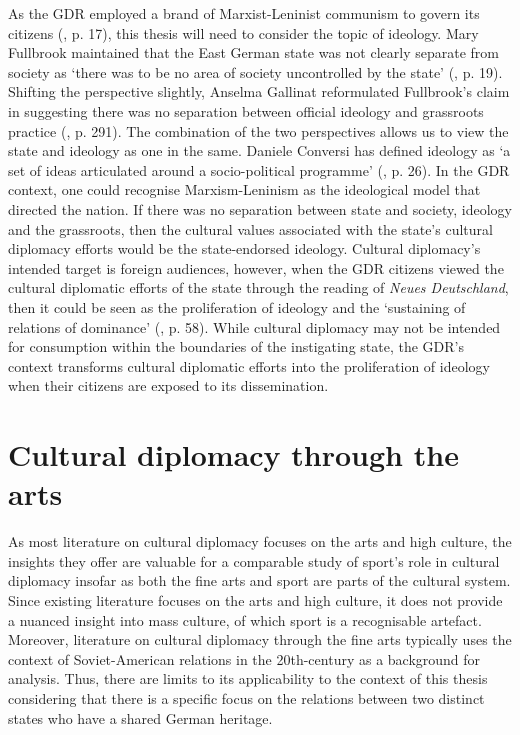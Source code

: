 As the GDR employed a brand of Marxist-Leninist communism to govern its citizens (\cite{grixcooke2002}, p. 17), this thesis will need to consider the topic of ideology. Mary Fullbrook maintained that the East German state was not clearly separate from society as ‘there was to be no area of society uncontrolled by the state’ (\citeyear{fullbrook1995}, p. 19). Shifting the perspective slightly, Anselma Gallinat reformulated Fullbrook’s claim in suggesting there was no separation between official ideology and grassroots practice (\citeyear{gallinat2005}, p. 291). The combination of the two perspectives allows us to view the state and ideology as one in the same. Daniele Conversi has defined ideology as ‘a set of ideas articulated around a socio-political programme’ (\citeyear{conversi2010}, p. 26). In the GDR context, one could recognise Marxism-Leninism as the ideological model that directed the nation. If there was no separation between state and society, ideology and the grassroots, then the cultural values associated with the state’s cultural diplomacy efforts would be the state-endorsed ideology. Cultural diplomacy’s intended target is foreign audiences, however, when the GDR citizens viewed the cultural diplomatic efforts of the state through the reading of \textit{Neues Deutschland}, then it could be seen as the proliferation of ideology and the ‘sustaining of relations of dominance’ (\cite{thompson1990}, p. 58). While cultural diplomacy may not be intended for consumption within the boundaries of the instigating state, the GDR’s context transforms cultural diplomatic efforts into the proliferation of ideology when their citizens are exposed to its dissemination.

\section{Cultural diplomacy through the arts}

As most literature on cultural diplomacy focuses on the arts and high culture, the insights they offer are valuable for a comparable study of sport’s role in cultural diplomacy insofar as both the fine arts and sport are parts of the cultural system. Since existing literature focuses on the arts and high culture, it does not provide a nuanced insight into mass culture, of which sport is a recognisable artefact. Moreover, literature on cultural diplomacy through the fine arts typically uses the context of Soviet-American relations in the 20th-century as a background for analysis. Thus, there are limits to its applicability to the context of this thesis considering that there is a specific focus on the relations between two distinct states who have a shared German heritage.

